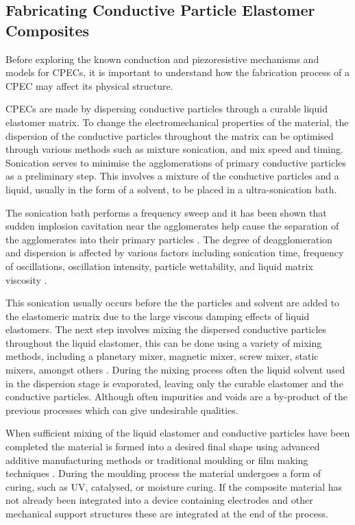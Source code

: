 \subsection{Fabricating Conductive Particle Elastomer Composites}
\label{subsec:Fabricating Conductive Particle Elastomer Composites}
Before exploring the known conduction and piezoresistive mechanisms and models for CPECs, it is important to understand how the fabrication process of a CPEC may affect its physical structure. 

CPECs are made by dispersing conductive particles through a curable liquid elastomer matrix. To change the electromechanical properties of the material, the dispersion of the conductive particles throughout the matrix can be optimised through various methods such as mixture sonication, and mix speed and timing. Sonication serves to minimise the agglomerations of primary conductive particles as a preliminary step. This involves a mixture of the conductive particles and a liquid, usually in the form of a solvent, to be placed in a ultra-sonication bath. 

The sonication bath performs a frequency sweep and it has been shown that sudden implosion cavitation near the agglomerates help cause the separation of the agglomerates into their primary particles \cite{Priyadarshi2021,Kudryashova2019}. The degree of deagglomeration and dispersion is affected by various factors including sonication time, frequency of oscillations, oscillation intensity, particle wettability, and liquid matrix viscosity \cite{Kudryashova2019,Chen2020a}. 

This sonication usually occurs before the the particles and solvent are added to the elastomeric matrix due to the large viscous damping effects of liquid elastomers. The next step involves mixing the dispersed conductive particles throughout the liquid elastomer, this can be done using a variety of mixing methods, including a planetary mixer, magnetic mixer, screw mixer, static mixers, amongst others \cite{Pegel2008,Rosset2016,Fekiri2020,Kim2012}. During the mixing process often the liquid solvent used in the dispersion stage is evaporated, leaving only the curable elastomer and the conductive particles. Although often impurities and voids are a by-product of the previous processes which can give undesirable qualities.

When sufficient mixing of the liquid elastomer and conductive particles have been completed the material is formed into a desired final shape using advanced additive manufacturing methods \cite{Bastola2018,Sapra2023,Krueger2014,Li2020,McCoul2017,Yi2023,Park2018} or traditional moulding \cite{Kim2018} or film making techniques \cite{Fasolt2017}. During the moulding process the material undergoes a form of curing, such as UV, catalysed, or moisture curing. If the composite material has not already been integrated into a device containing electrodes and other mechanical support structures these are integrated at the end of the process.


